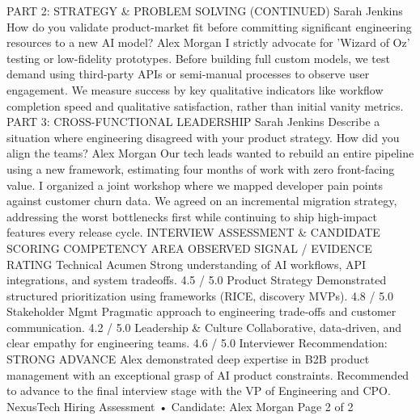 PART 2: STRATEGY \& PROBLEM SOLVING (CONTINUED)
Sarah Jenkins
How do you validate product-market fit before committing significant engineering resources to a new AI model?
Alex Morgan
I strictly advocate for 'Wizard of Oz' testing or low-fidelity prototypes. Before building full custom models, we test
demand using third-party APIs or semi-manual processes to observe user engagement. We measure success by key
qualitative indicators like workflow completion speed and qualitative satisfaction, rather than initial vanity metrics.
PART 3: CROSS-FUNCTIONAL LEADERSHIP
Sarah Jenkins
Describe a situation where engineering disagreed with your product strategy. How did you align the teams?
Alex Morgan
Our tech leads wanted to rebuild an entire pipeline using a new framework, estimating four months of work with zero
front-facing value. I organized a joint workshop where we mapped developer pain points against customer churn
data. We agreed on an incremental migration strategy, addressing the worst bottlenecks first while continuing to ship
high-impact features every release cycle.
INTERVIEW ASSESSMENT \& CANDIDATE SCORING
COMPETENCY AREA
OBSERVED SIGNAL / EVIDENCE
RATING
Technical Acumen
Strong understanding of AI workflows, API integrations, and system tradeoffs.
4.5 /
5.0
Product Strategy
Demonstrated structured prioritization using frameworks (RICE, discovery
MVPs).
4.8 /
5.0
Stakeholder Mgmt
Pragmatic approach to engineering trade-offs and customer communication.
4.2 /
5.0
Leadership \&
Culture
Collaborative, data-driven, and clear empathy for engineering teams.
4.6 /
5.0
Interviewer Recommendation: STRONG ADVANCE
Alex demonstrated deep expertise in B2B product management with an exceptional grasp of AI product
constraints. Recommended to advance to the final interview stage with the VP of Engineering and CPO.
NexusTech Hiring Assessment • Candidate: Alex Morgan
Page 2 of 2
